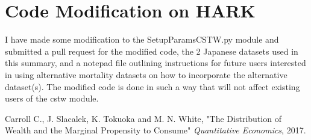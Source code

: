 \documentclass[11pt]{article} %
\begin{document}
\section{Code Modification on HARK}

I have made some modification to the SetupParamsCSTW.py module and submitted a pull request for the modified code, the 2 Japanese datasets used in this summary, and a notepad file outlining instructions for future users interested in using alternative mortality datasets on how to incorporate the alternative dataset(s). The modified code is done in such a way that will not affect existing users of the cstw module.

\begin{thebibliography}{9}
Carroll C., J. Slacalek, K. Tokuoka and M. N. White, "The Distribution of Wealth and the Marginal Propensity to Consume"
\textit{Quantitative Economics}, 2017.
\end{thebibliography}
\end{document}
